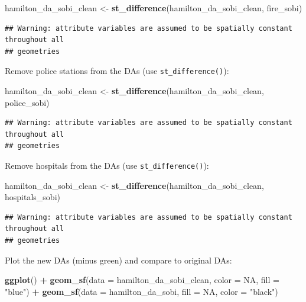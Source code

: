 \documentclass[
]{article}
\newenvironment{Shaded}{\begin{snugshade}}{\end{snugshade}}
\newcommand{\DataTypeTok}[1]{\textcolor[rgb]{0.13,0.29,0.53}{#1}}
\newcommand{\KeywordTok}[1]{\textcolor[rgb]{0.13,0.29,0.53}{\textbf{#1}}}
\newcommand{\NormalTok}[1]{#1}
\newcommand{\OperatorTok}[1]{\textcolor[rgb]{0.81,0.36,0.00}{\textbf{#1}}}
\newcommand{\OtherTok}[1]{\textcolor[rgb]{0.56,0.35,0.01}{#1}}
\newcommand{\StringTok}[1]{\textcolor[rgb]{0.31,0.60,0.02}{#1}}
\begin{document}
\begin{Shaded}
\begin{Highlighting}[]
\NormalTok{hamilton_da_sobi_clean <-}\StringTok{ }\KeywordTok{st_difference}\NormalTok{(hamilton_da_sobi_clean, fire_sobi)}
\end{Highlighting}
\end{Shaded}

\begin{verbatim}
## Warning: attribute variables are assumed to be spatially constant throughout all
## geometries
\end{verbatim}

Remove police stations from the DAs (use \texttt{st\_difference()}):

\begin{Shaded}
\begin{Highlighting}[]
\NormalTok{hamilton_da_sobi_clean <-}\StringTok{ }\KeywordTok{st_difference}\NormalTok{(hamilton_da_sobi_clean, police_sobi)}
\end{Highlighting}
\end{Shaded}

\begin{verbatim}
## Warning: attribute variables are assumed to be spatially constant throughout all
## geometries
\end{verbatim}

Remove hospitals from the DAs (use \texttt{st\_difference()}):

\begin{Shaded}
\begin{Highlighting}[]
\NormalTok{hamilton_da_sobi_clean <-}\StringTok{ }\KeywordTok{st_difference}\NormalTok{(hamilton_da_sobi_clean, hospitals_sobi)}
\end{Highlighting}
\end{Shaded}

\begin{verbatim}
## Warning: attribute variables are assumed to be spatially constant throughout all
## geometries
\end{verbatim}

Plot the new DAs (minus green) and compare to original DAs:

\begin{Shaded}
\begin{Highlighting}[]
\KeywordTok{ggplot}\NormalTok{() }\OperatorTok{+}
\StringTok{  }\KeywordTok{geom_sf}\NormalTok{(}\DataTypeTok{data =}\NormalTok{ hamilton_da_sobi_clean,}
          \DataTypeTok{color =} \OtherTok{NA}\NormalTok{,}
          \DataTypeTok{fill =} \StringTok{"blue"}\NormalTok{) }\OperatorTok{+}
\StringTok{  }\KeywordTok{geom_sf}\NormalTok{(}\DataTypeTok{data =}\NormalTok{ hamilton_da_sobi,}
          \DataTypeTok{fill =} \OtherTok{NA}\NormalTok{,}
          \DataTypeTok{color =} \StringTok{"black"}\NormalTok{)}
\end{Highlighting}
\end{Shaded}
\end{document}
